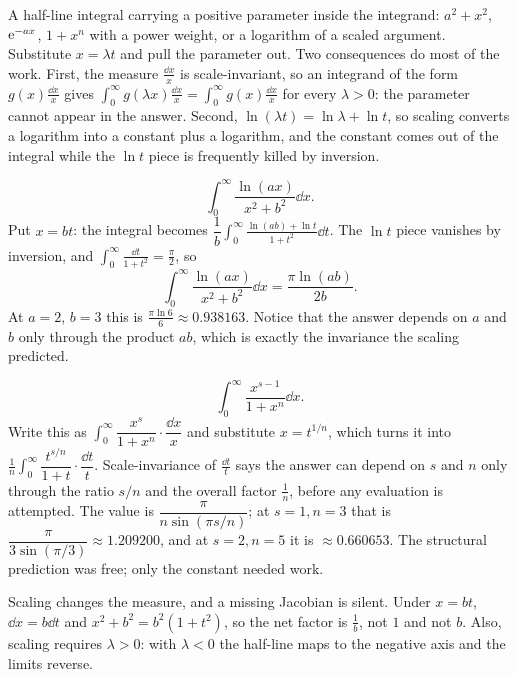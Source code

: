 \cue A half-line integral carrying a positive parameter inside the integrand: $a^{2}+x^{2}$, $\mathrm{e}^{-ax}$, $1+x^{n}$ with a power weight, or a logarithm of a scaled argument.
\method Substitute $x=\lambda t$ and pull the parameter out. Two consequences do most of the work. First, the measure $\tfrac{\dd x}{x}$ is scale-invariant, so an integrand of the form $g(x)\tfrac{\dd x}{x}$ gives $\int_0^{\infty}g(\lambda x)\tfrac{\dd x}{x}=\int_0^{\infty}g(x)\tfrac{\dd x}{x}$ for every $\lambda>0$: the parameter cannot appear in the answer. Second, $\ln(\lambda t)=\ln\lambda+\ln t$, so scaling converts a logarithm into a constant plus a logarithm, and the constant comes out of the integral while the $\ln t$ piece is frequently killed by inversion.

\begin{worked}
\[\int_0^{\infty}\frac{\ln(ax)}{x^{2}+b^{2}}\dd x.\]
Put $x=bt$: the integral becomes $\dfrac1b\displaystyle\int_0^{\infty}\frac{\ln(ab)+\ln t}{1+t^{2}}\dd t$. The $\ln t$ piece vanishes by inversion, and $\int_0^{\infty}\tfrac{\dd t}{1+t^{2}}=\tfrac{\pi}{2}$, so
\[\int_0^{\infty}\frac{\ln(ax)}{x^{2}+b^{2}}\dd x=\frac{\pi\ln(ab)}{2b}.\]
At $a=2$, $b=3$ this is $\tfrac{\pi\ln6}{6}\approx0.938163$. Notice that the answer depends on $a$ and $b$ only through the product $ab$, which is exactly the invariance the scaling predicted.
\end{worked}

\begin{worked}
\[\int_0^{\infty}\frac{x^{s-1}}{1+x^{n}}\dd x.\]
Write this as $\int_0^{\infty}\dfrac{x^{s}}{1+x^{n}}\cdot\dfrac{\dd x}{x}$ and substitute $x=t^{1/n}$, which turns it into $\tfrac1n\int_0^{\infty}\dfrac{t^{s/n}}{1+t}\cdot\dfrac{\dd t}{t}$. Scale-invariance of $\tfrac{\dd t}{t}$ says the answer can depend on $s$ and $n$ only through the ratio $s/n$ and the overall factor $\tfrac1n$, before any evaluation is attempted. The value is $\dfrac{\pi}{n\sin(\pi s/n)}$; at $s=1,n=3$ that is $\dfrac{\pi}{3\sin(\pi/3)}\approx1.209200$, and at $s=2,n=5$ it is $\approx0.660653$. The structural prediction was free; only the constant needed work.
\end{worked}

\begin{trap}
Scaling changes the measure, and a missing Jacobian is silent. Under $x=bt$, $\dd x=b\dd t$ and $x^{2}+b^{2}=b^{2}(1+t^{2})$, so the net factor is $\tfrac1b$, not $1$ and not $b$. Also, scaling requires $\lambda>0$: with $\lambda<0$ the half-line maps to the negative axis and the limits reverse.
\end{trap}

